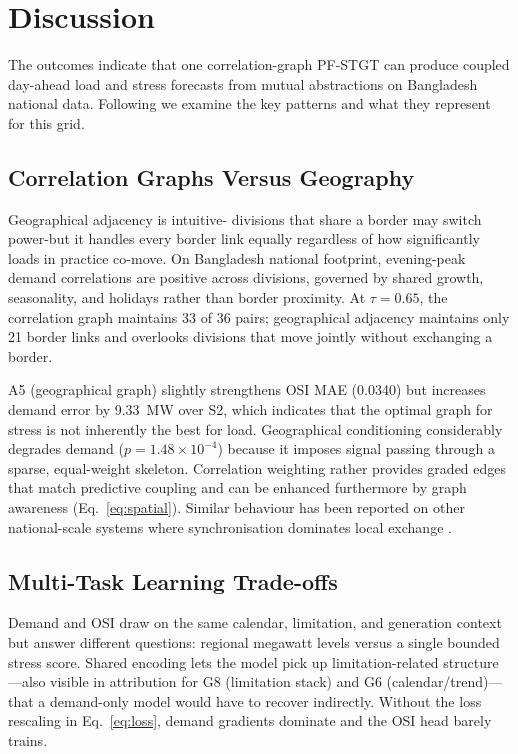 \section{Discussion}\label{sec:discussion}

The outcomes indicate that one correlation-graph PF-STGT can produce coupled day-ahead load and stress forecasts from mutual abstractions on Bangladesh national data. Following we examine the key patterns and what they represent for this grid.

\subsection{Correlation Graphs Versus Geography}

Geographical adjacency is intuitive- divisions that share a border may switch power-but it handles every border link equally regardless of how significantly loads in practice co-move. On Bangladesh national footprint, evening-peak demand correlations are positive across divisions, governed by shared growth, seasonality, and holidays rather than border proximity. At $\tau{=}0.65$, the correlation graph maintains 33 of 36 pairs; geographical adjacency maintains only 21 border links and overlooks divisions that move jointly without exchanging a border.

A5 (geographical graph) slightly strengthens OSI MAE (0.0340) but increases demand error by 9.33~MW over S2, which indicates that the optimal graph for stress is not inherently the best for load. Geographical conditioning considerably degrades demand ($p{=}1.48{\times}10^{-4}$) because it imposes signal passing through a sparse, equal-weight skeleton. Correlation weighting rather provides graded edges that match predictive coupling and can be enhanced furthermore by graph awareness (Eq.~\eqref{eq:spatial}). Similar behaviour has been reported on other national-scale systems where synchronisation dominates local exchange \cite{Zhao2024GraphAttentionTransformer,Bentsen2023GraphTransformer}.

\subsection{Multi-Task Learning Trade-offs}

Demand and OSI draw on the same calendar, limitation, and generation context but answer different questions: regional megawatt levels versus a single bounded stress score. Shared encoding lets the model pick up limitation-related structure---also visible in attribution for G8 (limitation stack) and G6 (calendar/trend)---that a demand-only model would have to recover indirectly. Without the loss rescaling in Eq.~\eqref{eq:loss}, demand gradients dominate and the OSI head barely trains.

